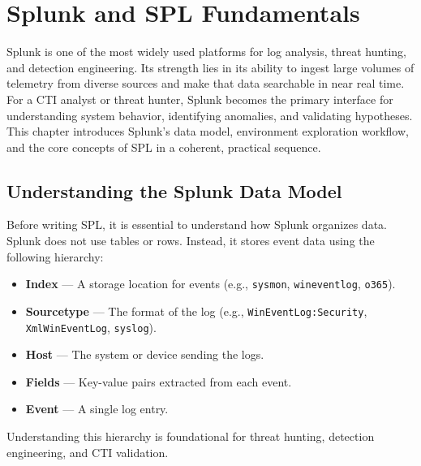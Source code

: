 \section{Splunk and SPL Fundamentals}

Splunk is one of the most widely used platforms for log analysis, threat hunting, and detection engineering. 
Its strength lies in its ability to ingest large volumes of telemetry from diverse sources and make that data 
searchable in near real time. For a CTI analyst or threat hunter, Splunk becomes the primary interface for 
understanding system behavior, identifying anomalies, and validating hypotheses. This chapter introduces Splunk's 
data model, environment exploration workflow, and the core concepts of SPL in a coherent, practical sequence.


\subsection*{Understanding the Splunk Data Model}

Before writing SPL, it is essential to understand how Splunk organizes data. Splunk does not use tables or rows. 
Instead, it stores event data using the following hierarchy:

\begin{itemize}
    \item \textbf{Index} — A storage location for events (e.g., \texttt{sysmon}, \texttt{wineventlog}, \texttt{o365}).
    \item \textbf{Sourcetype} — The format of the log (e.g., \texttt{WinEventLog:Security}, \texttt{XmlWinEventLog}, \texttt{syslog}).
    \item \textbf{Host} — The system or device sending the logs.
    \item \textbf{Fields} — Key-value pairs extracted from each event.
    \item \textbf{Event} — A single log entry.
\end{itemize}

Understanding this hierarchy is foundational for threat hunting, detection engineering, and CTI validation.


